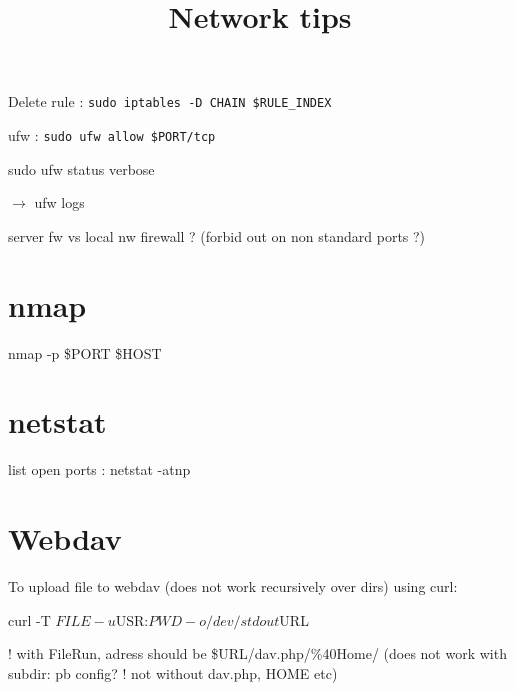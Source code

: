 


\title{Network tips}



\date{}


\maketitle

\justify

\renewcommand{\abstractname}{}

\begin{abstract}

\end{abstract}




Delete rule : \texttt{sudo iptables -D CHAIN \$RULE_INDEX}

ufw : \texttt{sudo ufw allow \$PORT/tcp}

sudo ufw status verbose

$\rightarrow$ ufw logs

server fw vs local nw firewall ? (forbid out on non standard ports ?)


\section*{nmap}

nmap -p \$PORT \$HOST 


\section*{netstat}

list open ports : netstat -atnp



\section*{Webdav}

To upload file to webdav (does not work recursively over dirs) using curl:

curl -T $FILE -u $USR:$PWD -o /dev/stdout $URL

! with FileRun, adress should be \$URL/dav.php/\%40Home/
(does not work with subdir: pb config? ! not without dav.php, HOME etc)










